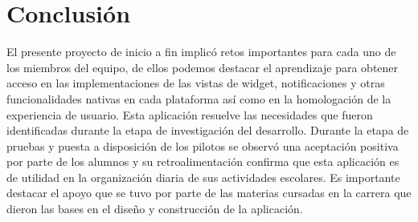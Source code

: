 \documentclass[10pt]{article}
\begin{document}
\newpage

\section{Conclusión}
\justify
El presente proyecto de inicio a fin implicó retos importantes para cada uno de los miembros del equipo, de ellos podemos destacar el aprendizaje para obtener acceso en las implementaciones de las vistas de widget, notificaciones y otras funcionalidades nativas en cada plataforma así como en la homologación de la experiencia de usuario. Esta aplicación resuelve las necesidades que fueron identificadas durante la etapa de investigación del desarrollo. Durante la etapa de pruebas y puesta a disposición de los pilotos se observó una aceptación positiva por parte de los alumnos y su retroalimentación confirma que esta aplicación es de utilidad en la organización diaria de sus actividades escolares. Es importante destacar el apoyo que se tuvo por parte de las materias cursadas en la carrera que dieron las bases en el diseño y construcción de la aplicación.

 
 
\end{document}
